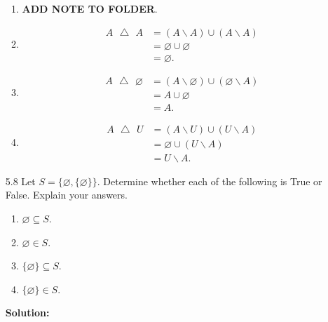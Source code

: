 \begin{enumerate}
      \begin{enumerate}
         \item \textbf{ADD NOTE TO FOLDER}.
         \item \begin{align*}
                  A\mbox{ }\triangle\mbox{ }A
                     &= (A{\backslash}A) \cup (A{\backslash}A) \\
                     &= \varnothing \cup \varnothing \\
                     &= \varnothing.
               \end{align*}
         \item \begin{align*}
                  A\mbox{ }\triangle\mbox{ }\varnothing
                     &= (A{\backslash}\varnothing)\cup
                        (\varnothing{\backslash}A) \\
                     &= A \cup \varnothing \\
                     &= A.
               \end{align*}
         \item \begin{align*}
                  A\mbox{ }\triangle\mbox{ }U
                     &= (A{\backslash}U) \cup (U{\backslash}A) \\
                     &= \varnothing \cup (U{\backslash}A) \\
                     &= U{\backslash}A.
               \end{align*}
      \end{enumerate}
   \item[5.8]  Let $S = \{\varnothing, \{\varnothing\}\}$. Determine whether
               each of the following is True or False. Explain your answers.
               \begin{enumerate}
                  \item $\varnothing \subseteq S$.
                  \item $\varnothing \in S$.
                  \item $\{\varnothing\} \subseteq S$.
                  \item $\{\varnothing\} \in S$.
               \end{enumerate}
               
      \textbf{Solution:}
      

\end{enumerate}
